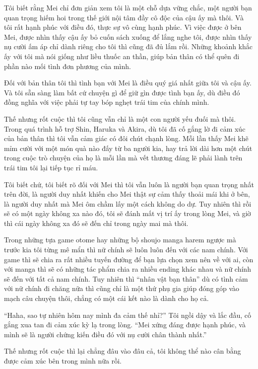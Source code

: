 {Tôi biết rằng Mei chỉ đơn giản xem tôi là một chỗ dựa vững chắc, một
người bạn quan trọng hiếm hoi trong thế giới nội tâm đầy cô độc của cậu
ấy mà thôi. Và tôi rất hạnh phúc với điều đó, thực sự vô cùng hạnh phúc.
Vì việc được ở bên Mei, được nhìn thấy cậu ấy bỏ cuốn sách xuống để lắng
nghe tôi, được nhìn thấy nụ cười ấm áp chỉ dành riêng cho tôi thì cũng
đã đủ lắm rồi. Những khoảnh khắc ấy với tôi mà nói giống như liều thuốc
an thần, giúp bản thân có thể quên đi phần nào mối tình đơn phương của
mình.

Đối với bản thân tôi thì tình bạn với Mei là điều quý giá nhất giữa tôi
và cậu ấy. Và tôi sẵn sàng làm bất cứ chuyện gì để giữ gìn được tình bạn
ấy, dù điều đó đồng nghĩa với việc phải tự tay bóp nghẹt trái tim của
chính mình.

Thế nhưng rốt cuộc thì tôi cũng vẫn chỉ là một con người yếu đuối mà
thôi. Trong quá trình hỗ trợ Shin, Haruka và Akira, dù tôi đã cố gắng lờ
đi cảm xúc của bản thân thì tôi vẫn cảm giác có đôi chút chạnh lòng. Mỗi
lần thấy Mei khẽ mỉm cười với một món quà nào đấy từ ba người kia, hay
trả lời dài hơn một chút trong cuộc trò chuyện của họ là mỗi lần mà vết
thương đáng lẽ phải lành trên trái tim tôi lại tiếp tục rỉ máu.

Tôi biết chứ, tôi biết rõ đối với Mei thì tôi vẫn luôn là người bạn quan
trọng nhất trên đời, là người duy nhất khiến cho Mei thật sự cảm thấy
thoải mái khi ở bên, là người duy nhất mà Mei ôm chầm lấy một cách không
do dự. Tuy nhiên thì rồi sẽ có một ngày không xa nào đó, tôi sẽ đánh mất
vị trí ấy trong lòng Mei, và giờ thì cái ngày không xa đó sẽ đến chỉ
trong ngày mai mà thôi.

Trong những tựa game otome hay những bộ shoujo manga harem ngược mà
trước kia tôi từng mê mẩn thì nữ chính sẽ luôn luôn đến với các nam
chính. Với game thì sẽ chia ra rất nhiều tuyến đường để bạn lựa chọn xem
nên về với ai, còn với manga thì sẽ có những tác phẩm chia ra nhiều
ending khác nhau và nữ chính sẽ đến với tất cả nam chính. Tuy nhiên thì
``nhân vật bạn thân'' dù có tình cảm với nữ chính đi chăng nữa thì cũng
chỉ là một thứ phụ gia giúp đóng góp vào mạch câu chuyện thôi, chẳng có
một cái kết nào là dành cho họ cả.

``Haha, sao tự nhiên hôm nay mình đa cảm thế nhỉ?'' Tôi ngồi dậy và lắc
đầu, cố gắng xua tan đi cảm xúc kỳ lạ trong lòng. ``Mei xứng đáng được
hạnh phúc, và mình sẽ là người chứng kiến điều đó với nụ cười chân thành
nhất.''

Thế nhưng rốt cuộc thì lại chẳng đâu vào đâu cả, tôi không thể nào cân
bằng được cảm xúc bên trong mình nữa rồi.

}
